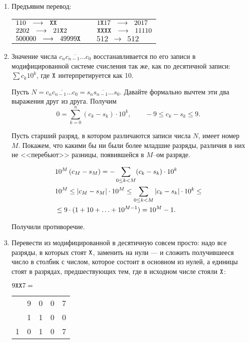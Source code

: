 
\begin{enumerate}

\item Предъявим перевод:

\def\ra{\ \ \longrightarrow\ \ }
\def\X{\text{\ttfamily X}}
\begin{center}\begin{tabular}{lll}
	$110 \ra \X\X$ & \quad & $1\X17 \ra 2017$ \\
	$2202 \ra 21\X2$ & & $\X\X\X\X \ra 11110$ \\
	$500000 \ra 49999\X$ & & $512 \ra 512$
\end{tabular}\end{center}

\item Значение числа $\overline{c_nc_{n-1}\ldots c_0}$ восстанавливается по его записи в модифицированной системе счисления так же, как по десятичной записи: $\sum c_k10^k$, где $\X$ интерпретируется как 10.

Пусть $N = \overline{c_nc_{n-1}\ldots c_0} = \overline{s_ns_{n-1}\ldots s_0}$. Давайте формально вычтем эти два выражения друг из друга. Получим
$$0 = \sum\limits_{k=0}^n (c_k-s_k) \cdot 10^k, \qquad -9 \le c_k-s_k \le 9.$$

Пусть старший разряд, в котором различаются записи числа $N$, имеет номер $M$. Покажем, что какими бы ни были более младшие разряды, различия в них не <<перебьют>> разницы, появившейся в $M$--ом разряде.

\begin{align*}
	& 10^M \left( c_M-s_M \right) =
		- \sum\limits_{0 \le k < M} (c_k-s_k) \cdot 10^k \\
	& 10^M \le \left| c_M-s_M \right| \cdot 10^M \le
		\sum\limits_{0 \le k < M} \left| c_k-s_k \right| \cdot 10^k \le \\
	& \le 9 \cdot (1 + 10 + \ldots + 10^{M-1}) = 10^M-1.
\end{align*}

Получили противоречие.

\item Перевести из модифицированной в десятичную совсем просто: надо все разряды, в которых стоят $\X$, заменить на нули — и сложить получившееся число в столбик с числом, которое состоит в основном из нулей, а единицы стоят в разрядах, предшествующих тем, где в исходном числе стояли $\X$:

\begin{center}
$9\X\X7 =$ \begin{tabular}{ccccc}
	   & 9 & 0 & 0 & 7 \\
	   & 1 & 1 & 0 & 0 \\ \hline
	1 & 0 & 1 & 0 & 7 \\
\end{tabular} \end{center}


\end{enumerate}
